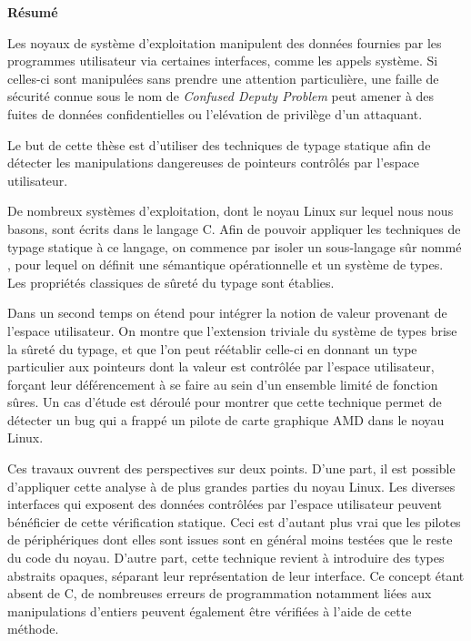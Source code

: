 \cleartoverso
{}

\begin{headingpage}
\thispagestyle{empty}

\begin{center}\Large \textbf{Résumé}\end{center}

Les noyaux de système d'exploitation manipulent des données fournies par les
programmes utilisateur via certaines interfaces, comme les appels système. Si
celles-ci sont manipulées sans prendre une attention particulière, une faille de
sécurité connue sous le nom de \emph{Confused Deputy Problem} peut amener à des
fuites de données confidentielles ou l'elévation de privilège d'un attaquant.

Le but de cette thèse est d'utiliser des techniques de typage statique afin de
détecter les manipulations dangereuses de pointeurs contrôlés par l'espace
utilisateur.

De nombreux systèmes d'exploitation, dont le noyau Linux sur lequel nous nous
basons, sont écrits dans le langage C. Afin de pouvoir appliquer les techniques
de typage statique à ce langage, on commence par isoler un sous-langage sûr
nommé \langname, pour lequel on définit une sémantique opérationnelle et un
système de types. Les propriétés classiques de sûreté du typage sont établies.

Dans un second temps on étend \langname pour intégrer la notion de valeur
provenant de l'espace utilisateur. On montre que l'extension triviale du système
de types brise la sûreté du typage, et que l'on peut réétablir celle-ci en
donnant un type particulier aux pointeurs dont la valeur est contrôlée par
l'espace utilisateur, forçant leur déférencement à se faire au sein d'un
ensemble limité de fonction sûres. Un cas d'étude est déroulé pour montrer que
cette technique permet de détecter un bug qui a frappé un pilote de carte
graphique AMD dans le noyau Linux.

Ces travaux ouvrent des perspectives sur deux points. D'une part, il est
possible d'appliquer cette analyse à de plus grandes parties du noyau Linux. Les
diverses interfaces qui exposent des données contrôlées par l'espace utilisateur
peuvent bénéficier de cette vérification statique. Ceci est d'autant plus vrai
que les pilotes de périphériques dont elles sont issues sont en général moins
testées que le reste du code du noyau. D'autre part, cette technique revient à
introduire des types abstraits opaques, séparant leur représentation de leur
interface. Ce concept étant absent de C, de nombreuses erreurs de programmation
notamment liées aux manipulations d'entiers peuvent également être vérifiées à
l'aide de cette méthode.


\end{headingpage}
